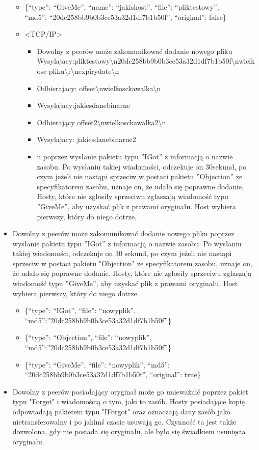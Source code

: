 \documentclass[10pt,a4paper]{article}
\begin{document}
\begin{itemize}
\begin{itemize}
\item \{“type”: “GiveMe”, “name”: “jakishost”, “file”: “pliktestowy”,
\\“md5”: “20dc258bb9b0b3ce53a32d1df7b1b50f”, “original”: false\}
\item <TCP/IP>
\begin{itemize}
\renewcommand{\labelitemiii}{$\circ$}
\item Dowolny z peerów może zakomunikować dodanie nowego pliku
\\Wysylajacy:pliktestowy\textbackslash n20dc258bb9b0b3ce53a32d1df7b1b50f\textbackslash nwielkosc pliku\textbackslash r\textbackslash nexpirydate\textbackslash n
\item Odbierajacy: offset\textbackslash nwielkosckawalka\textbackslash n
\item Wysylajacy:jakiesdanebinarne
\item Odbierający offset2\textbackslash nwielkosckawalka2\textbackslash n
\item Wysylajacy: jakiesdanebinarne2
\item u poprzez wysłanie pakietu typu ''IGot'' z informacją o nazwie zasobu. Po wysłaniu takiej wiadomości, odczekuje on 30sekund, po czym jeżeli nie nastąpi sprzeciw w postaci pakietu ''Objection'' ze specyfikatorem zasobu, uznaje on, że udało się poprawne dodanie. Hosty, które nie zgłosiły sprzeciwu zgłaszają wiadomość typu ''GiveMe'', aby uzyskać plik z prawami oryginału. Host wybiera pierwszy, który do niego dotrze.
\end{itemize}
\end{itemize}
\item Dowolny z peerów może zakomunikować dodanie nowego pliku poprzez wysłanie pakietu typu ''IGot'' z informacją o nazwie zasobu. Po wysłaniu takiej wiadomości, odczekuje on 30 sekund, po czym jeżeli nie nastąpi sprzeciw w postaci pakietu "Objection" ze specyfikatorem zasobu, uznaje on, że udało się poprawne dodanie. Hosty, które nie zgłosiły sprzeciwu zgłaszają wiadomość typu ''GiveMe'', aby uzyskać plik z prawami oryginału. Host wybiera pierwszy, który do niego dotrze.
\begin{itemize}
\item \{“type”: “IGot”, “file”: “nowyplik”, “md5”:”20dc258bb9b0b3ce53a32d1df7b1b50f”\}
\item \{“type”: “Objection”, “file”: “nowyplik”, “md5”:”20dc258bb9b0b3ce53a32d1df7b1b50f”\}
\item \{“type”: “GiveMe”, “file”: “nowyplik”, “md5”: “20dc258bb9b0b3ce53a32d1df7b1b50f”, “original”: true\}
\end{itemize}
\item Dowolny z peerów posiadający oryginał może go unieważnić poprzez pakiet typu "Forget" i wiadomością o tym, jaki to zasób. Hosty posiadające kopię odpowiadają pakietem typu "IForgot" oraz oznaczają dany zasób jako nietransferowalny i po jakimś czasie usuwają
go. Czynność ta jest także dozwolona, gdy nie posiada się oryginału,
ale było się świadkiem usunięcia oryginału.


\end{itemize}
\end{document}
